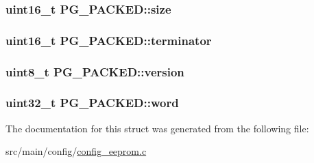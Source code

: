 \hypertarget{structPG__PACKED_a54f90d2a7f3575e4a8747aa895a029b1}{
\subsubsection[{size}]{\setlength{\rightskip}{0pt plus 5cm}uint16\+\_\+t P\+G\+\_\+\+P\+A\+C\+K\+E\+D\+::size}}\label{structPG__PACKED_a54f90d2a7f3575e4a8747aa895a029b1}
\hypertarget{structPG__PACKED_a98ef29ee25199fca207a59246a1de6e9}{
\subsubsection[{terminator}]{\setlength{\rightskip}{0pt plus 5cm}uint16\+\_\+t P\+G\+\_\+\+P\+A\+C\+K\+E\+D\+::terminator}}\label{structPG__PACKED_a98ef29ee25199fca207a59246a1de6e9}
\hypertarget{structPG__PACKED_ab3b61517b84238983be864b18ae81d62}{
\subsubsection[{version}]{\setlength{\rightskip}{0pt plus 5cm}uint8\+\_\+t P\+G\+\_\+\+P\+A\+C\+K\+E\+D\+::version}}\label{structPG__PACKED_ab3b61517b84238983be864b18ae81d62}
\hypertarget{structPG__PACKED_acbc1fc975256148dcadcb10057faf27a}{
\subsubsection[{word}]{\setlength{\rightskip}{0pt plus 5cm}uint32\+\_\+t P\+G\+\_\+\+P\+A\+C\+K\+E\+D\+::word}}\label{structPG__PACKED_acbc1fc975256148dcadcb10057faf27a}


The documentation for this struct was generated from the following file\+:\begin{DoxyCompactItemize}
\item 
src/main/config/\hyperlink{config__eeprom_8c}{config\+\_\+eeprom.\+c}\end{DoxyCompactItemize}

